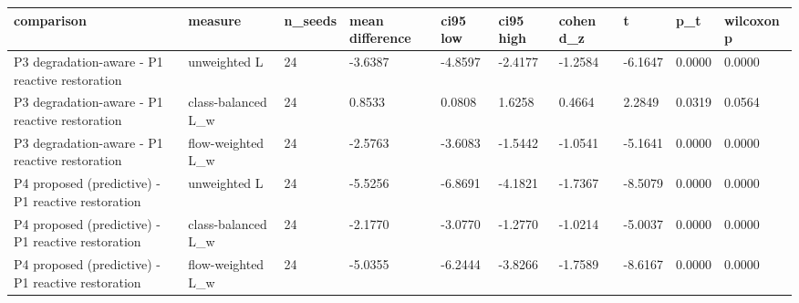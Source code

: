 \begin{tabular}{llllllllll}
\toprule
comparison & measure & n\_seeds & mean difference & ci95 low & ci95 high & cohen d\_z & t & p\_t & wilcoxon p \\
\midrule
P3 degradation-aware - P1 reactive restoration & unweighted L & 24 & -3.6387 & -4.8597 & -2.4177 & -1.2584 & -6.1647 & 0.0000 & 0.0000 \\
P3 degradation-aware - P1 reactive restoration & class-balanced L\_w & 24 & 0.8533 & 0.0808 & 1.6258 & 0.4664 & 2.2849 & 0.0319 & 0.0564 \\
P3 degradation-aware - P1 reactive restoration & flow-weighted L\_w & 24 & -2.5763 & -3.6083 & -1.5442 & -1.0541 & -5.1641 & 0.0000 & 0.0000 \\
P4 proposed (predictive) - P1 reactive restoration & unweighted L & 24 & -5.5256 & -6.8691 & -4.1821 & -1.7367 & -8.5079 & 0.0000 & 0.0000 \\
P4 proposed (predictive) - P1 reactive restoration & class-balanced L\_w & 24 & -2.1770 & -3.0770 & -1.2770 & -1.0214 & -5.0037 & 0.0000 & 0.0000 \\
P4 proposed (predictive) - P1 reactive restoration & flow-weighted L\_w & 24 & -5.0355 & -6.2444 & -3.8266 & -1.7589 & -8.6167 & 0.0000 & 0.0000 \\
\bottomrule
\end{tabular}
